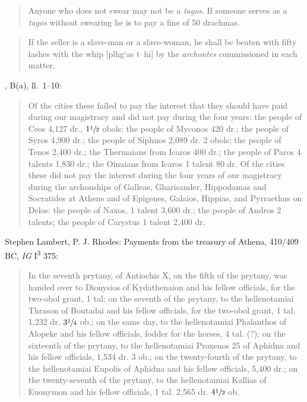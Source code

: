 \documentclass{article}
\newcommand{\Gk}[1]{\selectlanguage{polutonikogreek}#1\selectlanguage{english}}
\begin{document}
\begin{quote}
Anyone who does not swear may not be a {\em tagos}. If someone serves as a {\em tagos} without swearing he is to pay a fine of 50 drachmas.
\end{quote}

\begin{quote}
If the seller is a slave-man or a slave-woman, he shall be beaten with fifty lashes with the whip [\Gk{plhg`as t~hi}] by the {\em archontes} commissioned in each matter.
\end{quote}

\cite[p.~141]{rhodes}, B(a), ll.~1--10:

\begin{quote}
Of the cities these failed to pay the interest that they should have paid during our magistracy and did not pay during the four years:
the people of Ceos 4,127 dr., $1 \sfrac{1}{2}$ obols; the people of Myconos
420 dr.; the people of Syros 4,900 dr.; the people of
Siphnos 2,089 dr. 2 obols; the people of Tenos 2,400 dr.; the Thermaians from Icaros 400 dr.;
the people of Paros 4 talents 1,830 dr.; the Oinaians from Icaros 1 talent 80 dr. Of the cities these did not pay the interest during the
four years of our magistracy during the archonships of Galleas, Gharisander, Hippodamas and Socratides at Athens and of Epigenes,
Galaios, Hippias, and Pyrraethus on Delos: the people of Naxos, 1 talent 3,600 dr.; the people of Andros 2 talents; the people of
Carystus 1 talent 2,400 dr.
\end{quote}

Stephen Lambert, P. J. Rhodes: Payments from the treasury of Athena, 410/409 BC, {\em IG} I\textsuperscript{3} 375:

\begin{quote}
In the seventh prytany, of Antiochis X, on the fifth of the prytany, was handed over to Dionysios of Kydathenaion and his fellow officials, for the two-obol grant, 1 tal; on the seventh
of the prytany, to the hellenotamiai Thrason of Boutadai and his fellow officials, for the two-obol grant, 1 tal. 1,232 dr. $3 \sfrac{1}{4}$ ob.; on the same day, to the hellenotamiai
Phalanthos of Alopeke and his fellow officials, fodder for the horses, 4 tal. (?); on the sixteenth of the prytany, to the hellenotamiai Proxenos 25 of Aphidna and his fellow officials,
1,534 dr. 3 ob.; on the twenty-fourth of the prytany, to the hellenotamiai Eupolis of Aphidna and his fellow officials, 5,400 dr.; on the twenty-seventh of the prytany, to the
hellenotamiai Kallias of Euonymon and his fellow officials, 1 tal. 2,565 dr. $4 \sfrac{1}{2}$ ob.
\end{quote}
\end{document}
